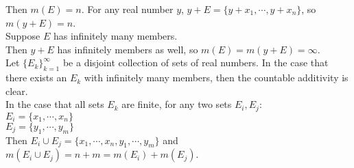 \begin{enumerate}
    Then $m(E)=n$. For any real number $y$, $y+E = \{y+x_1,\cdots,y+x_n\}$, so $m(y+E)=n$.\\
    Suppose $E$ has infinitely many members.\\
    Then $y+E$ has infinitely members as well, so $m(E)=m(y+E)=\infty$.\\
    Let $\{E_k\}_{k=1}^\infty$ be a disjoint collection of sets of real numbers.
    In the case that there exists an $E_k$ with infinitely many members, then the countable additivity is clear.
    \\In the case that all sets $E_k$ are finite, for any two sets $E_i,E_j$:\\
    $E_i = \{x_1,\cdots,x_n\}$\\
    $E_j = \{y_1,\cdots,y_m\}$\\  
    Then $E_i\cup E_j = \{x_1,\cdots,x_n,y_1,\cdots,y_m\}$ and $m(E_i\cup E_j)=n+m=m(E_i) +m(E_j)$.
\end{enumerate}

